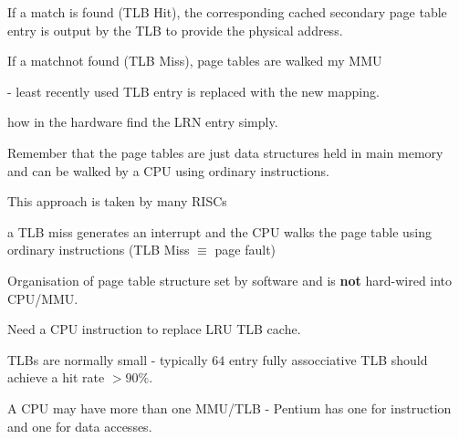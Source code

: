 \documentclass[a4paper,12pt]{article}
\begin{document}
If a match is found (TLB Hit), the corresponding cached secondary page
table entry is output by the TLB to provide the physical address.

If a matchnot found (TLB Miss), page tables are walked my MMU

\indent - least recently used TLB entry is replaced with the new
mapping.

\indent how in the hardware find the LRN entry simply.

Remember that the page tables are just data structures held in main
memory and can be walked by a CPU using ordinary instructions.

\indent This approach is taken by many RISCs

\indent a TLB miss generates an interrupt and the CPU walks the page
table using ordinary instructions (TLB Miss $\equiv$ page fault)

\indent Organisation of page table structure set by software and is
\textbf{not} hard-wired into CPU/MMU.

\indent Need a CPU instruction to replace LRU TLB cache.

TLBs are normally small - typically $64$ entry fully assocciative TLB
should achieve a hit rate $> 90\%$.

A CPU may have more than one MMU/TLB - Pentium has one for instruction
and one for data accesses.
\end{document}
